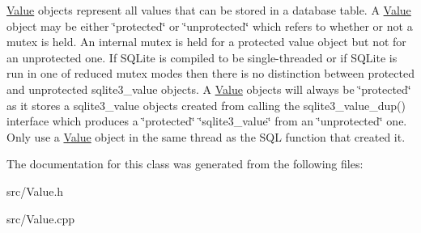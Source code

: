 \hyperlink{class_s_q_lite_1_1_value}{Value} objects represent all values that can be stored in a database table. A \hyperlink{class_s_q_lite_1_1_value}{Value} object may be either \char`\"{}protected\char`\"{} or \char`\"{}unprotected\char`\"{} which refers to whether or not a mutex is held. An internal mutex is held for a protected value object but not for an unprotected one. If S\-Q\-Lite is compiled to be single-\/threaded or if S\-Q\-Lite is run in one of reduced mutex modes then there is no distinction between protected and unprotected sqlite3\-\_\-value objects. A \hyperlink{class_s_q_lite_1_1_value}{Value} objects will always be \char`\"{}protected\char`\"{} as it stores a sqlite3\-\_\-value objects created from calling the sqlite3\-\_\-value\-\_\-dup() interface which produces a \char`\"{}protected\char`\"{} \char`\"{}sqlite3\-\_\-value\char`\"{} from an \char`\"{}unprotected\char`\"{} one. Only use a \hyperlink{class_s_q_lite_1_1_value}{Value} object in the same thread as the S\-Q\-L function that created it. 

The documentation for this class was generated from the following files\-:\begin{DoxyCompactItemize}
\item 
src/Value.\-h\item 
src/Value.\-cpp\end{DoxyCompactItemize}
